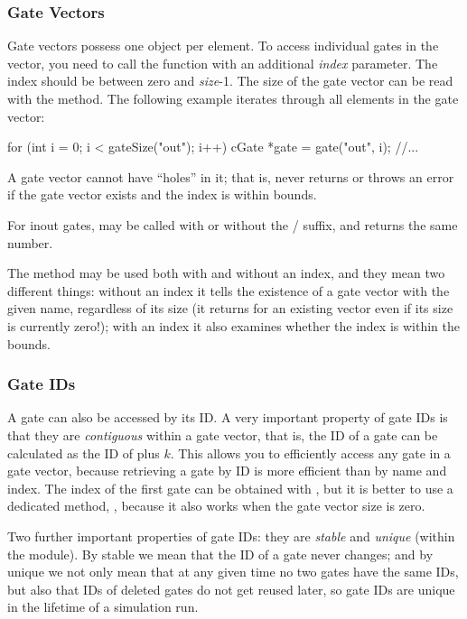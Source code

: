\begin{ned}
\subsubsection{Gate Vectors}
\label{sec:simple-modules:gate-vectors}

Gate vectors possess one  object per element.
To access individual gates in the vector, you need to call
the  function with an additional \textit{index}
parameter. The index should be between zero and \textit{size}-1.
The size of the gate vector can be read with the 
method. The following example iterates through all elements in the
gate vector:

\begin{cpp}
for (int i = 0; i < gateSize("out"); i++) {
    cGate *gate = gate("out", i);
    //...
}
\end{cpp}

A gate vector cannot have ``holes'' in it; that is, 
never returns  or throws an error if the gate vector exists
and the index is within bounds.

For inout gates,  may be called with or without
the / suffix, and returns the same number.

The  method may be used both with and without an
index, and they mean two different things: without an index it tells
the existence of a gate vector with the given name, regardless of its
size (it returns  for an existing vector even if its size
is currently zero!); with an index it also examines whether the index
is within the bounds.


\subsubsection{Gate IDs}
\label{sec:simple-modules:gate-ids}

A gate can also be accessed by its ID. A very important property of gate IDs
is that they are \textit{contiguous} within a gate vector, that is,
the ID of a gate  can be calculated as the ID of  plus $k$.
This allows you to efficiently access any gate in a gate vector, because
retrieving a gate by ID is more efficient than by name and index.
The index of the first gate can be obtained with ,
but it is better to use a dedicated method, ,
because it also works when the gate vector size is zero.

Two further important properties of gate IDs: they are \textit{stable}
and \textit{unique} (within the module). By stable we mean that the ID
of a gate never changes; and by unique we not only mean that at any
given time no two gates have the same IDs, but also that IDs of deleted
gates do not get reused later, so gate IDs are unique in the lifetime
of a simulation run.


\end{ned}
